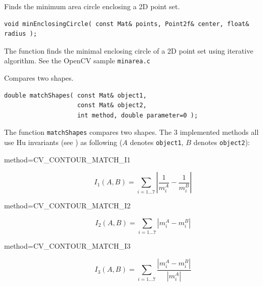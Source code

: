 \begin{description}
\label{minEnclosingCircle}
Finds the minimum area circle enclosing a 2D point set.

\begin{lstlisting}
void minEnclosingCircle( const Mat& points, Point2f& center, float& radius );    
\end{lstlisting}
\begin{description}
\end{description}

The function finds the minimal enclosing circle of a 2D point set using iterative algorithm. See the OpenCV sample \texttt{minarea.c}

\label{matchShapes}
Compares two shapes.

\begin{lstlisting}
double matchShapes( const Mat& object1,
                    const Mat& object2,
                    int method, double parameter=0 );
\end{lstlisting}
\begin{description}
\end{description}

The function \texttt{matchShapes} compares two shapes. The 3 implemented methods all use Hu invariants (see ) as following ($A$ denotes \texttt{object1}, $B$ denotes \texttt{object2}):

\begin{description}
\item[method=CV\_CONTOUR\_MATCH\_I1]
\[ I_1(A,B) = \sum_{i=1...7} \left| \frac{1}{m^A_i} - \frac{1}{m^B_i} \right| \]

\item[method=CV\_CONTOUR\_MATCH\_I2]
\[ I_2(A,B) = \sum_{i=1...7} \left| m^A_i - m^B_i \right| \]

\item[method=CV\_CONTOUR\_MATCH\_I3]
\[ I_3(A,B) = \sum_{i=1...7} \frac{ \left| m^A_i - m^B_i \right| }{ \left| m^A_i \right| } \]
\end{description}


\end{description}
